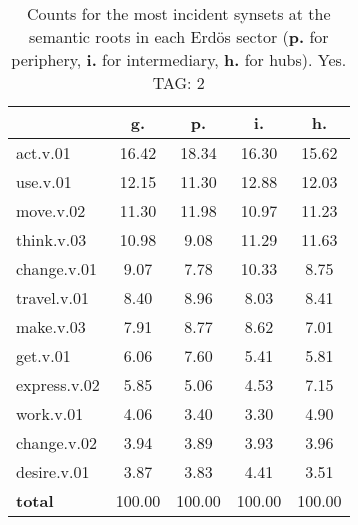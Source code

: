 \begin{table}[h!]
\begin{center}
\begin{tabular}{| l || c | c | c | c |}\hline
 & {\bf g.} & {\bf p.} & {\bf i.} & {\bf h.} \\\hline\hline
act.v.01 & 16.42  & 18.34  & 16.30  & 15.62 \\\hline
use.v.01 & 12.15  & 11.30  & 12.88  & 12.03 \\\hline
move.v.02 & 11.30  & 11.98  & 10.97  & 11.23 \\\hline
think.v.03 & 10.98  & 9.08  & 11.29  & 11.63 \\\hline
change.v.01 & 9.07  & 7.78  & 10.33  & 8.75 \\\hline
travel.v.01 & 8.40  & 8.96  & 8.03  & 8.41 \\\hline
make.v.03 & 7.91  & 8.77  & 8.62  & 7.01 \\\hline
get.v.01 & 6.06  & 7.60  & 5.41  & 5.81 \\\hline
express.v.02 & 5.85  & 5.06  & 4.53  & 7.15 \\\hline
work.v.01 & 4.06  & 3.40  & 3.30  & 4.90 \\\hline
change.v.02 & 3.94  & 3.89  & 3.93  & 3.96 \\\hline
desire.v.01 & 3.87  & 3.83  & 4.41  & 3.51 \\\hline\hline
{{\bf total}} & 100.00  & 100.00  & 100.00  & 100.00 \\\hline
\end{tabular}
\caption{Counts for the most incident synsets at the semantic roots in each Erd\"os sector ({\bf p.} for periphery, {\bf i.} for intermediary, {\bf h.} for hubs). Yes. TAG: 2}
\end{center}
\end{table}